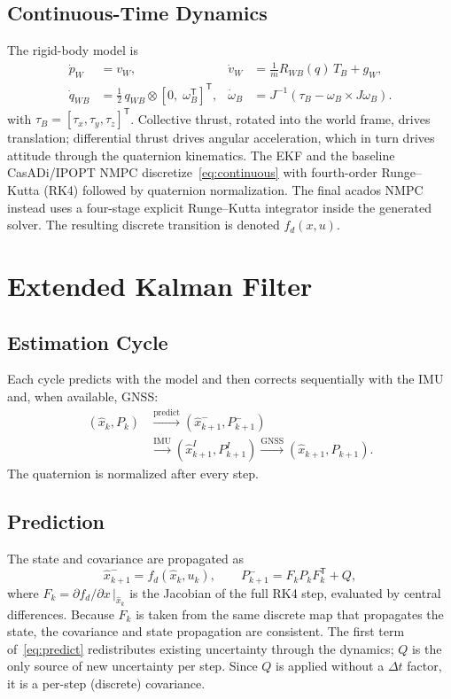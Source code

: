 \documentclass[conference]{IEEEtran}
\newcommand{\T}{^{\mathsf T}}
\begin{document}
\subsection{Continuous-Time Dynamics}
The rigid-body model is
\begin{equation}
\begin{aligned}
\dot p_W &= v_W, &
\dot v_W &= \tfrac{1}{m}R_{WB}(q)\,T_B+g_W,\\
\dot q_{WB} &= \tfrac12\,q_{WB}\otimes[0,\;\omega_B\T]\T, &
\dot\omega_B &= J^{-1}(\tau_B-\omega_B\times J\omega_B).
\end{aligned}
\label{eq:continuous}
\end{equation}
with $\tau_B=[\tau_x,\tau_y,\tau_z]\T$. Collective thrust, rotated into the world frame, drives translation; differential thrust drives angular acceleration, which in turn drives attitude through the quaternion kinematics. The EKF and the baseline CasADi/IPOPT NMPC discretize~\eqref{eq:continuous} with fourth-order Runge--Kutta (RK4) followed by quaternion normalization. The final acados NMPC instead uses a four-stage explicit Runge--Kutta integrator inside the generated solver. The resulting discrete transition is denoted $f_d(x,u)$.

\section{Extended Kalman Filter}
\subsection{Estimation Cycle}
Each cycle predicts with the model and then corrects sequentially with the IMU and, when available, GNSS:
\begin{equation}
\begin{aligned}
(\hat x_k,P_k)&\xrightarrow{\text{predict}}(\hat x^-_{k+1},P^-_{k+1})\\
&\xrightarrow{\text{IMU}}(\hat x^I_{k+1},P^I_{k+1})
\xrightarrow{\text{GNSS}}(\hat x_{k+1},P_{k+1}).
\end{aligned}
\label{eq:ekfflow}
\end{equation}
The quaternion is normalized after every step.

\subsection{Prediction}
The state and covariance are propagated as
\begin{equation}
\hat x^-_{k+1}=f_d(\hat x_k,u_k),\qquad
P^-_{k+1}=F_kP_kF_k\T+Q,
\label{eq:predict}
\end{equation}
where $F_k=\partial f_d/\partial x\,|_{\hat x_k}$ is the Jacobian of the full RK4 step, evaluated by central differences. Because $F_k$ is taken from the same discrete map that propagates the state, the covariance and state propagation are consistent. The first term of~\eqref{eq:predict} redistributes existing uncertainty through the dynamics; $Q$ is the only source of new uncertainty per step. Since $Q$ is applied without a $\Delta t$ factor, it is a per-step (discrete) covariance.
\end{document}
